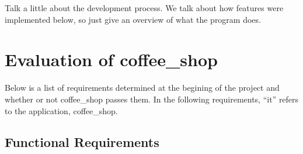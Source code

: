 \documentclass[10pt]{article}
\begin{document}
Talk a little about the development process. We talk about how features were implemented below, so just give an overview of what the program does.

\section{Evaluation of coffee\_shop}

Below is a list of requirements determined at the begining of the project and whether or not coffee\_shop passes them. In the following requirements, ``it'' refers to the application, coffee\_shop.

\subsection{Functional Requirements}
\end{document}
